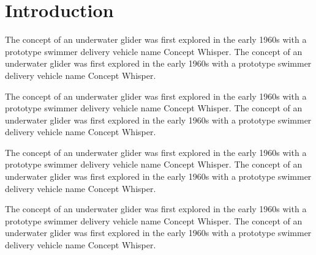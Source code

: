 \documentclass[12pt]{article}
\begin{document}
\section{Introduction}
The concept of an underwater glider was first explored in the early 1960s with a prototype swimmer delivery vehicle name Concept Whisper. The concept of an underwater glider was first explored in the early 1960s with a prototype swimmer delivery vehicle name Concept Whisper. 

The concept of an underwater glider was first explored in the early 1960s with a prototype swimmer delivery vehicle name Concept Whisper. The concept of an underwater glider was first explored in the early 1960s with a prototype swimmer delivery vehicle name Concept Whisper.

The concept of an underwater glider was first explored in the early 1960s with a prototype swimmer delivery vehicle name Concept Whisper. The concept of an underwater glider was first explored in the early 1960s with a prototype swimmer delivery vehicle name Concept Whisper.%

\setlength{\parskip}{1em}
The concept of an underwater glider was first explored in the early 1960s with a prototype swimmer delivery vehicle name Concept Whisper. The concept of an underwater glider was first explored in the early 1960s with a prototype swimmer delivery vehicle name Concept Whisper.
\end{document}
